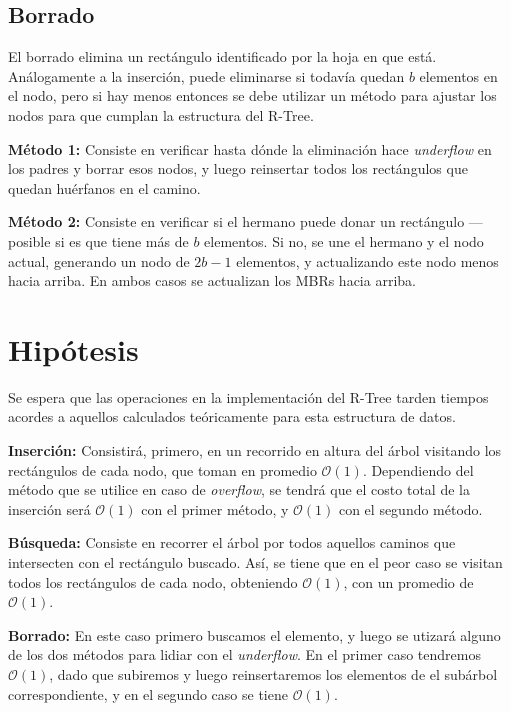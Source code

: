 \documentclass[12pt,spanish]{article}
\begin{document}
\subsection{Borrado}
	El borrado elimina un rect\'angulo identificado por la hoja en que est\'a. An\'alogamente a la inserci\'on, puede eliminarse si todav\'ia quedan $b$ elementos en el nodo, pero si hay menos entonces se debe utilizar un m\'etodo para ajustar los nodos para que cumplan la estructura del R-Tree.
	
\textbf{M\'etodo 1:} Consiste en verificar hasta d\'onde la eliminaci\'on hace \emph{underflow} en los padres y borrar esos nodos, y luego reinsertar todos los rect\'angulos que quedan hu\'erfanos en el camino.

\textbf{M\'etodo 2:} Consiste en verificar si el hermano puede donar un rect\'angulo ---posible si es que tiene m\'as de $b$ elementos. Si no, se une el hermano y el nodo actual, generando un nodo de $2b-1$ elementos, y actualizando este nodo menos hacia arriba. En ambos casos se actualizan los MBRs hacia arriba.

\section{Hip\'otesis}
	Se espera que las operaciones en la implementaci\'on del R-Tree tarden tiempos acordes a aquellos calculados te\'oricamente para esta estructura de datos.
	 
\textbf{Inserci\'on:} Consistir\'a, primero, en un recorrido en altura del \'arbol visitando los rect\'angulos de cada nodo, que toman en promedio $\mathcal{O}(1)$. Dependiendo del m\'etodo que se utilice en caso de \emph{overflow}, se tendr\'a que el costo total de la inserci\'on ser\'a $\mathcal{O}(1)$ con el primer m\'etodo, y $\mathcal{O}(1)$ con el segundo m\'etodo.
	
\textbf{B\'usqueda:} Consiste en recorrer el \'arbol por todos aquellos caminos que intersecten con el rect\'angulo buscado. As\'i, se tiene que en el peor caso se visitan todos los rect\'angulos de cada nodo, obteniendo $\mathcal{O}(1)$, con un promedio de $\mathcal{O}(1)$.

\textbf{Borrado:} En este caso primero buscamos el elemento, y luego se utizar\'a alguno de los dos m\'etodos para lidiar con el \emph{underflow}. En el primer caso tendremos $\mathcal{O}(1)$, dado que subiremos y luego reinsertaremos los elementos de el sub\'arbol correspondiente, y en el segundo caso se tiene $\mathcal{O}(1)$.
\end{document}
